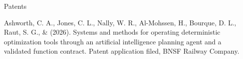 \begin{rSection}{Patents}
\begin{pubs}
    \item Ashworth, C. A., Jones, C. L., Nally, W. R., Al-Mohssen, H., Bourque, D. L., Raut, S. G., \& \me{} (2026). Systems and methods for operating deterministic optimization tools through an artificial intelligence planning agent and a validated function contract. Patent application filed, BNSF Railway Company.
\end{pubs}
\end{rSection}
